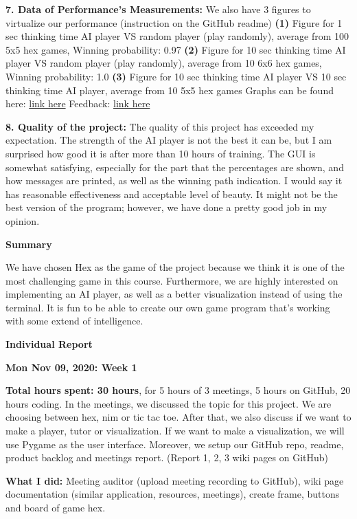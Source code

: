 \documentclass[12pt]{article}
\begin{document}
\textbf{7. Data of Performance's Measurements:} We also have 3 figures to virtualize our performance (instruction on the GitHub readme)
\textbf{(1)} Figure for 1 sec thinking time AI player VS random player (play randomly), average from 100 5x5 hex games, Winning probability: 0.97
\textbf{(2)} Figure for 10 sec thinking time AI player VS random player (play randomly), average from 10 6x6 hex games, Winning probability: 1.0
\textbf{(3)} Figure for 10 sec thinking time AI player VS 10 sec thinking time AI player, average from 10 5x5 hex games
Graphs can be found here: \href{https://github.com/HexKitties/CMPUT355HexKitties/blob/main/README.md}{link here}
Feedback: \href{https://github.com/HexKitties/CMPUT355HexKitties/wiki/Feed-back}{link here}

\textbf{8. Quality of the project:} The quality of this project has exceeded my expectation. The strength of the AI player is not the best it can be, but I am surprised how good it is after more than 10 hours of training. The GUI is somewhat satisfying, especially for the part that the percentages are shown, and how messages are printed, as well as the winning path indication. I would say it has reasonable effectiveness and acceptable level of beauty. It might not be the best version of the program; however, we have done a pretty good job in my opinion.

\newpage

\textbf{Summary}

We have chosen Hex as the game of the project because we think it is one of the most challenging game in this course. Furthermore, we are highly interested on implementing an AI player, as well as a better visualization instead of using the terminal. It is fun to be able to create our own game program that’s working with some extend of intelligence.

\textbf{Individual Report}

\textbf{Mon Nov 09, 2020: Week 1}

\textbf{Total hours spent: 30 hours}, for 5 hours of 3 meetings, 5 hours on GitHub, 20 hours coding.
In the meetings, we discussed the topic for this project. We are choosing between hex, nim or tic tac toe. After that, we also discuss if we want to make a player, tutor or visualization. If we want to make a visualization, we will use Pygame as the user interface. Moreover, we setup our GitHub repo, readme, product backlog and meetings report. (Report 1, 2, 3 wiki pages on GitHub)

\textbf{What I did:} Meeting auditor (upload meeting recording to GitHub), wiki page documentation (similar application, resources, meetings), create frame, buttons and board of game hex.
\end{document}
